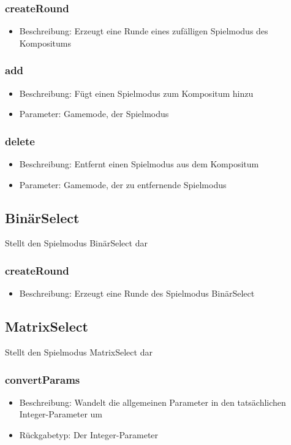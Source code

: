 \documentclass[a4paper]{scrreprt}
\begin{document}
   \subsubsection{createRound}
      \begin{itemize}
      \item Beschreibung: Erzeugt eine Runde eines zufälligen Spielmodus des Kompositums
      \end{itemize}
   \subsubsection{add}
        \begin{itemize}
           \item Beschreibung: Fügt einen Spielmodus zum Kompositum hinzu
           \item Parameter: Gamemode, der Spielmodus
        \end{itemize}
     \subsubsection{delete}
        \begin{itemize}
           \item Beschreibung: Entfernt einen Spielmodus aus dem Kompositum
           \item Parameter: Gamemode, der zu entfernende Spielmodus
        \end{itemize}
   
   \subsection{BinärSelect}
   Stellt den Spielmodus BinärSelect dar
   \subsubsection{createRound}
      \begin{itemize}
      \item Beschreibung: Erzeugt eine Runde des Spielmodus BinärSelect
      \end{itemize}
   
   \subsection{MatrixSelect}
   Stellt den Spielmodus MatrixSelect dar
   \subsubsection{convertParams}
      \begin{itemize}
      \item Beschreibung: Wandelt die allgemeinen Parameter in den tatsächlichen Integer-Parameter um
      \item Rückgabetyp: Der Integer-Parameter
      \end{itemize}
\end{document}
